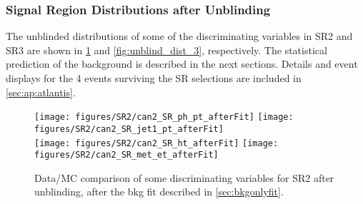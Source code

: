 




\clearpage

\subsubsection{Signal Region Distributions after Unblinding}

The unblinded distributions of some of the discriminating variables in SR2 and SR3 are shown in \Fig \ref{fig:unblind_dist_2} and \ref{fig:unblind_dist_3},
respectively. The statistical prediction of the background is described in the next sections.
Details and event displays for the 4 events surviving the SR selections are included in \App \ref{sec:ap:atlantis}.

\begin{figure}[ht!]
  \begin{center}
   \texttt{[image: figures/SR2/can2\_SR\_ph\_pt\_afterFit]}
   \texttt{[image: figures/SR2/can2\_SR\_jet1\_pt\_afterFit]}\\
   \texttt{[image: figures/SR2/can2\_SR\_ht\_afterFit]}
   \texttt{[image: figures/SR2/can2\_SR\_met\_et\_afterFit]}
    \caption{Data/MC comparison of some discriminating variables for SR2 after unblinding, after the bkg fit described in \Sec \ref{sec:bkgonlyfit}.}
    \label{fig:unblind_dist_2}
  \end{center}
\end{figure}


